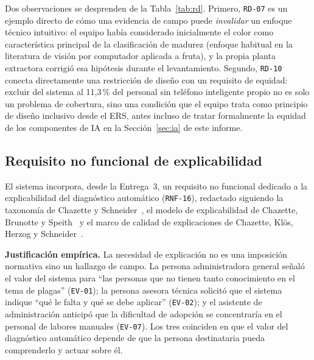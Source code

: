 \documentclass[11pt,a4paper]{article}
\newcommand{\id}[1]{\texttt{#1}}
\begin{document}
Dos observaciones se desprenden de la Tabla~\ref{tab:rd}. Primero, \id{RD-07} es un ejemplo directo
de cómo una evidencia de campo puede \emph{invalidar} un enfoque técnico intuitivo: el equipo había
considerado inicialmente el color como característica principal de la clasificación de madurez
(enfoque habitual en la literatura de visión por computador aplicada a fruta), y la propia planta
extractora corrigió esa hipótesis durante el levantamiento. Segundo, \id{RD-10} conecta
directamente una restricción de diseño con un requisito de equidad: excluir del sistema al 11,3\,\%
del personal sin teléfono inteligente propio no es solo un problema de cobertura, sino una
condición que el equipo trata como principio de diseño inclusivo desde el ERS, antes incluso de
tratar formalmente la equidad de los componentes de IA en la Sección~\ref{sec:ia} de este informe.

\subsection{Requisito no funcional de explicabilidad}

El sistema incorpora, desde la Entrega~3, un requisito no funcional dedicado a la explicabilidad
del diagnóstico automático (\id{RNF-16}), redactado siguiendo la taxonomía de Chazette y
Schneider~\cite{chazette2020}, el modelo de explicabilidad de Chazette, Brunotte y
Speith~\cite{chazette2021} y el marco de calidad de explicaciones de Chazette, Klös, Herzog y
Schneider~\cite{chazette2022}.

\textbf{Justificación empírica.} La necesidad de explicación no es una imposición normativa sino un
hallazgo de campo. La persona administradora general señaló el valor del sistema para
``las personas que no tienen tanto conocimiento en el tema de plagas'' (\id{EV-01}); la persona
asesora técnica solicitó que el sistema indique ``qué le falta y qué se debe aplicar'' (\id{EV-02});
y el asistente de administración anticipó que la dificultad de adopción se concentraría en el
personal de labores manuales (\id{EV-07}). Los tres coinciden en que el valor del diagnóstico
automático depende de que la persona destinataria pueda comprenderlo y actuar sobre él.
\end{document}
